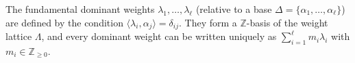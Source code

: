 The fundamental dominant weights $\lambda_1, \ldots, \lambda_\ell$ (relative to a base $\Delta = \{\alpha_1, \ldots, \alpha_\ell\}$) are defined by the condition $\langle \lambda_i, \alpha_j \rangle = \delta_{ij}$. They form a $\mathbb{Z}$-basis of the weight lattice $\Lambda$, and every dominant weight can be written uniquely as $\sum_{i=1}^\ell m_i \lambda_i$ with $m_i \in \mathbb{Z}_{\geq 0}$.
